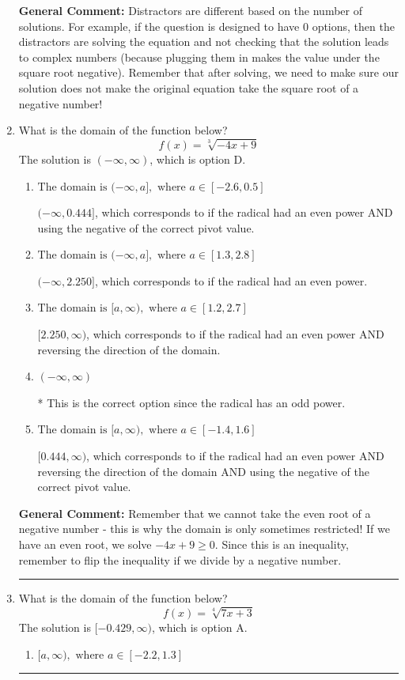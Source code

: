 \documentclass{extbook}[14pt]
\newcommand{\litem}[1]{\item #1

\rule{\textwidth}{0.4pt}}
\begin{document}
\begin{enumerate}
{\textbf{General Comment:} Distractors are different based on the number of solutions. For example, if the question is designed to have 0 options, then the distractors are solving the equation and not checking that the solution leads to complex numbers (because plugging them in makes the value under the square root negative). Remember that after solving, we need to make sure our solution does not make the original equation take the square root of a negative number!
}
\litem{
What is the domain of the function below?
\[ f(x) = \sqrt[3]{-4 x + 9} \]The solution is \( (-\infty, \infty) \), which is option D.\begin{enumerate}[label=\Alph*.]
\item \( \text{The domain is } (-\infty, a], \text{   where } a \in [-2.6, 0.5] \)

$(-\infty, 0.444]$, which corresponds to if the radical had an even power AND using the negative of the correct pivot value.
\item \( \text{The domain is } (-\infty, a], \text{   where } a \in [1.3, 2.8] \)

$(-\infty, 2.250]$, which corresponds to if the radical had an even power.
\item \( \text{The domain is } [a, \infty), \text{   where } a \in [1.2, 2.7] \)

$[2.250, \infty)$, which corresponds to if the radical had an even power AND reversing the direction of the domain.
\item \( (-\infty, \infty) \)

* This is the correct option since the radical has an odd power.
\item \( \text{The domain is } [a, \infty), \text{   where } a \in [-1.4, 1.6] \)

$[0.444, \infty)$, which corresponds to if the radical had an even power AND reversing the direction of the domain AND using the negative of the correct pivot value.
\end{enumerate}

\textbf{General Comment:} Remember that we cannot take the even root of a negative number - this is why the domain is only sometimes restricted! If we have an even root, we solve $-4 x + 9 \geq 0$. Since this is an inequality, remember to flip the inequality if we divide by a negative number.
}
\litem{
What is the domain of the function below?
\[ f(x) = \sqrt[4]{7 x + 3} \]The solution is \( [-0.429, \infty) \), which is option A.\begin{enumerate}[label=\Alph*.]
\item \( [a, \infty), \text{ where } a \in [-2.2, 1.3] \)


\end{enumerate}}
\end{enumerate}
\end{document}
